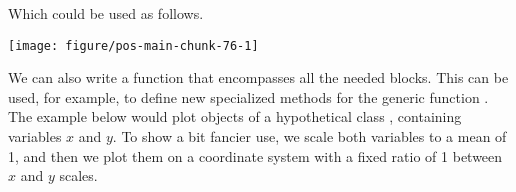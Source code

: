 \documentclass[krantz2]{krantz}\usepackage{knitr}%
\begin{document}
Which could be used as follows.

\begin{knitrout}\footnotesize
{}\color{fgcolor}\begin{kframe}
\begin{alltt}
\hlstd{(} 
          \hlstd{(}   
           \hlstd{=}  \hlopt{+}
          \hlstd{()}
\end{alltt}
\end{kframe}

{\centering \texttt{[image: figure/pos-main-chunk-76-1]} 

}



\end{knitrout}

We can also write a function that encompasses all the needed blocks. This can be used, for example, to define new specialized  methods for the generic function . The example below would plot objects of a hypothetical class , containing variables $x$ and $y$. To show a bit fancier use, we scale both variables to a mean of 1, and then we plot them on a coordinate system with a fixed ratio of 1 between $x$ and $y$ scales.

\begin{knitrout}\footnotesize
{}\color{fgcolor}\begin{kframe}
\begin{alltt}
 \hlkwb{<-} \hlstd{(}\hlstd{,} \hlstd{) \{}
  \hlstd{(}   \hlopt{/}  \hlopt{/}  \hlopt{+}
  \hlstd{()} \hlopt{+}
  \hlstd{()} \hlopt{+}
  \hlstd{(} \hlstd{=} \hlstd{,}  \hlstd{=} \hlstd{,}  \hlstd{=} \hlstd{)}
\hlstd{\}}
\end{alltt}
\end{kframe}
\end{knitrout}
\end{document}
